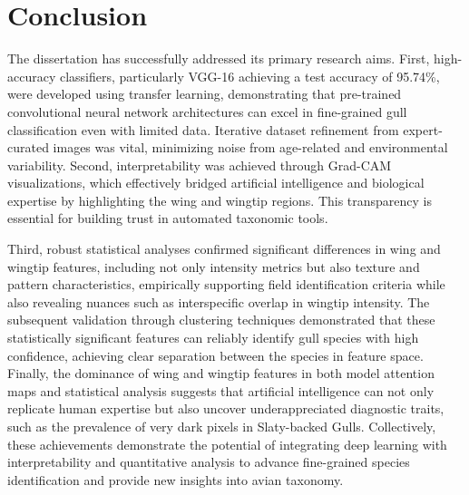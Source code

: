 \documentclass[a4paper,12pt]{report}
\begin{document}

\chapter{Conclusion}

The dissertation has successfully addressed its primary research aims. First, high-accuracy classifiers, particularly VGG-16 achieving a test accuracy of 95.74\%, were developed using transfer learning, demonstrating that pre-trained convolutional neural network architectures can excel in fine-grained gull classification even with limited data. Iterative dataset refinement from expert-curated images was vital, minimizing noise from age-related and environmental variability. Second, interpretability was achieved through Grad-CAM visualizations, which effectively bridged artificial intelligence and biological expertise by highlighting the wing and wingtip regions. This transparency is essential for building trust in automated taxonomic tools. 

Third, robust statistical analyses confirmed significant differences in wing and wingtip features, including not only intensity metrics but also texture and pattern characteristics, empirically supporting field identification criteria while also revealing nuances such as interspecific overlap in wingtip intensity. The subsequent validation through clustering techniques demonstrated that these statistically significant features can reliably identify gull species with high confidence, achieving clear separation between the species in feature space. Finally, the dominance of wing and wingtip features in both model attention maps and statistical analysis suggests that artificial intelligence can not only replicate human expertise but also uncover underappreciated diagnostic traits, such as the prevalence of very dark pixels in Slaty-backed Gulls. Collectively, these achievements demonstrate the potential of integrating deep learning with interpretability and quantitative analysis to advance fine-grained species identification and provide new insights into avian taxonomy.
\end{document}
